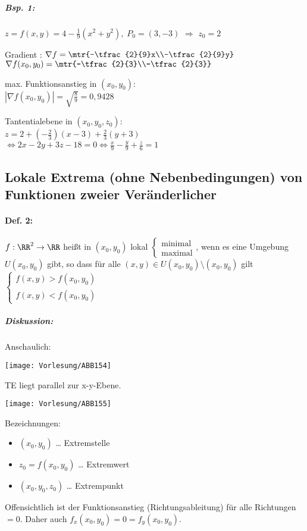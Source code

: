 \subparagraph{Bsp. 1:} $z=f(x,y)=4-\frac{1}{9}(x^2+y^2), \; P_0=(3,-3)$ $\Rightarrow$ $z_0=2$
\begin{anumerate}
\item Gradient : $\nabla f = \mtr{-\tfrac{2}{9}x\\-\tfrac{2}{9}y}$\\
$\nabla f(x_0,y_0)=\mtr{-\tfrac{2}{3}\\-\tfrac{2}{3}}$
\item max. Funktionsanstieg in $(x_0,y_0)$:\\
$|\nabla f(x_0,y_0)|=\sqrt{\tfrac{8}{9}}=0,9428$
\item Tantentialebene in $(x_0,y_0,z_0)$:\\
$z=2+(-\tfrac{2}{3})(x-3)+\tfrac{2}{3}(y+3)$\\
$\Leftrightarrow 2x-2y+3z-18=0 \Leftrightarrow \frac{x}{9}-\frac{y}{9}+\frac{z}{6}=1$
\end{anumerate}

\subsection{Lokale Extrema (ohne Nebenbedingungen) von Funktionen zweier Veränderlicher}
\paragraph{Def. 2:} $f: \RR^2\to \RR$ heißt in $(x_0,y_0)$ lokal $\begin{cases}
\text{minimal}\\
\text{maximal}
\end{cases}$, wenn es eine Umgebung $U(x_0,y_0)$ gibt, so dass für alle $(x,y)\in U(x_0,y_0)\setminus (x_0,y_0)$ gilt $\begin{cases}
f(x,y) > f(x_0,y_0)\\
f(x,y) < f(x_0,y_0)
\end{cases}$
\subparagraph{Diskussion:} Anschaulich:
\begin{center}
\texttt{[image: Vorlesung/ABB154]}
\end{center}
TE liegt parallel zur x-y-Ebene.
\begin{center}
\texttt{[image: Vorlesung/ABB155]}
\end{center}
Bezeichnungen: 
\begin{itemize}
\item $(x_0,y_0)$ … Extremstelle
\item $z_0=f(x_0,y_0)$ … Extremwert
\item $(x_0,y_0,z_0)$ … Extrempunkt
\end{itemize}
Offensichtlich ist der Funktionsanstieg (Richtungsableitung) für alle Richtungen $=0$. Daher auch $f_x(x_0,y_0)=0=f_y(x_0,y_0)$.
